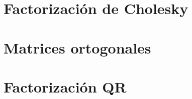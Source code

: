 \documentclass[a4paper]{article}
\begin{document}
\section{Factorización de Cholesky}
\label{section:factorizacion_de_cholesky}

\newpage

\section{Matrices ortogonales}
\label{section:matrices_ortogonales}

\newpage

\section{Factorización QR}
\label{section:factorizacon_qr}

\newpage
\end{document}
